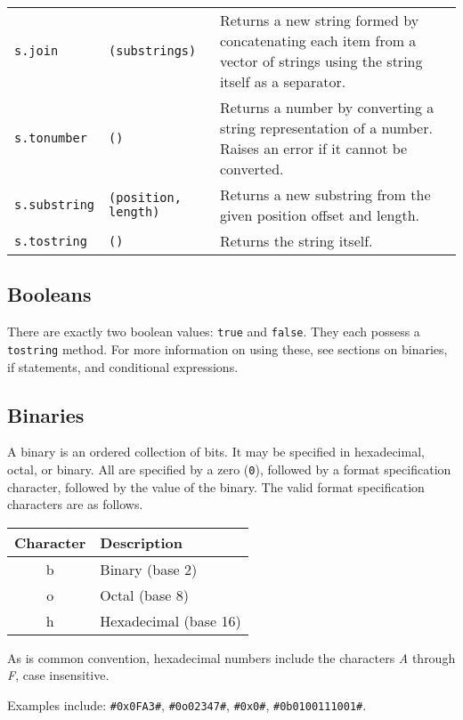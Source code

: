 \documentclass[11pt]{article}
\newcommand{\literal}[1]{\lstinline[style=DSL,identifierstyle=\itshape]!#1!}
\newcommand{\keyword}[1]{\literal{#1}}
\newcommand{\variable}[1]{\literal{#1}}
\begin{document}
\begin{longtable}[c]{l l|p{3.5in}}
\variable{s.join} & \literal{(substrings)} & Returns a new string formed by concatenating each item from a vector of strings using the string itself as a separator.\\
\variable{s.tonumber} & \literal{()} & Returns a number by converting a string representation of a number. Raises an error if it cannot be converted.\\
\variable{s.substring} & \literal{(position, length)} & Returns a new substring from the given position offset and length.\\
\variable{s.tostring} & \literal{()} & Returns the string itself.\\
\end{longtable}

\subsection{Booleans}

There are exactly two boolean values: \keyword{true} and \keyword{false}.  They each possess a \variable{tostring} method.  For more information on using these, see sections on binaries, if statements, and conditional expressions.

\subsection{Binaries}

A binary is an ordered collection of bits.  It may be specified in
hexadecimal, octal, or binary.  All are specified by a zero (\literal{0}),
followed by a format specification character, followed by the value of
the binary.  The valid format specification characters are as follows.

\begin{center}
\begin{tabular}{|c|p{3.5in}|}
\hline
Character & Description\\
\hline
b & Binary (base 2)\\
\hline
o & Octal (base 8)\\
\hline
h & Hexadecimal (base 16)\\
\hline
\end{tabular}
\end{center}

As is common convention, hexadecimal numbers include the characters
\textit{A} through \textit{F}, case insensitive.

Examples include: \literal{#0x0FA3#}, \literal{#0o02347#}, \literal{#0x0#}, \literal{#0b0100111001#}.
\end{document}
